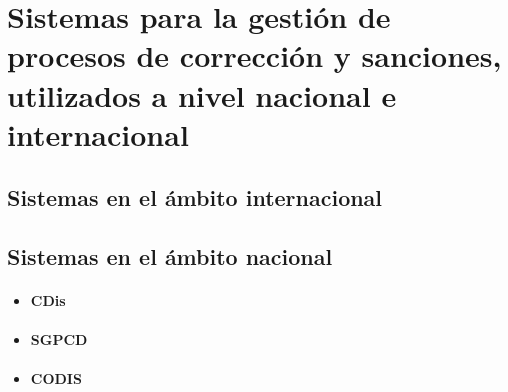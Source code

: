 \section[Sistemas homólogos]{Sistemas para la gestión de procesos de corrección y sanciones, utilizados a nivel nacional e internacional}

\subsection{Sistemas en el ámbito internacional}

\subsection{Sistemas en el ámbito nacional}
\begin{itemize}
	\item \paragraph{CDis}
	\item \paragraph{SGPCD}
	\item \paragraph{CODIS}
\end{itemize}

